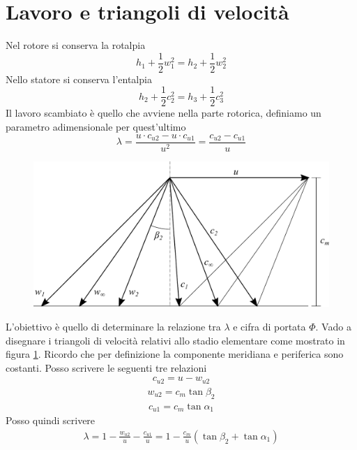 \section{Lavoro e triangoli di velocità}
Nel rotore si conserva la rotalpia
\begin{equation}
h_1 + \frac{1}{2} w_1^2 = h_2 + \frac{1}{2} w_2^2
\end{equation}
Nello statore si conserva l'entalpia
\begin{equation}
h_2 + \frac{1}{2} c_2^2 = h_3 + \frac{1}{2} c_3^2
\end{equation}
Il lavoro scambiato è quello che avviene nella parte rotorica, definiamo un parametro adimensionale per quest'ultimo
\begin{equation}
\lambda = \frac{u \cdot c_{u2} - u \cdot c_{u1}}{u^2} = \frac{c_{u2} - c_{u1}}{u}
\end{equation}
\begin{figure}
\centering
  \includegraphics[width=.9\textwidth]{fig/triangComp.pdf}
\caption{}
\label{fig:triangComp}
\end{figure}
L'obiettivo è quello di determinare la relazione tra $\lambda$ e cifra di portata $\Phi$. Vado a disegnare i triangoli di velocità relativi allo stadio elementare come mostrato in figura \ref{fig:triangComp}. Ricordo che per definizione la componente meridiana e periferica sono costanti. Posso scrivere le seguenti tre relazioni 
\begin{align*}
c_{u2} = u - w_{u2}
\end{align*}
\begin{align*}
w_{u2} = c_m \tan \beta_2
\end{align*}
\begin{align*}
c_{u1} = c_m \tan \alpha_1
\end{align*}
Posso quindi scrivere
\begin{align*}
\lambda = 1- \frac{w_{u2}}{u} - \frac{c_{u1}}{u} = 1 - \frac{c_m}{u} \left(\tan \beta_2 + \tan \alpha_1 \right)
\end{align*}
